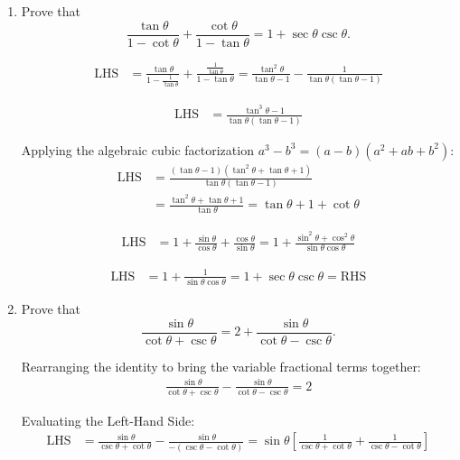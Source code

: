 \begin{enumerate}[label=\thesubsection.\arabic*, ref=\thesubsection.\theenumi]
	
	\item Prove that
	\[
	\frac{\tan\theta}{1-\cot\theta}
	+
	\frac{\cot\theta}{1-\tan\theta}
	=
	1 + \sec \theta \csc \theta.
	\]
	
	\solution
	
	\begin{align*}
		\text{LHS} &= \frac{\tan\theta}{1 - \frac{1}{\tan\theta}} + \frac{\frac{1}{\tan\theta}}{1 - \tan\theta} = \frac{\tan^2\theta}{\tan\theta - 1} - \frac{1}{\tan\theta(\tan\theta - 1)}
	\end{align*}

	\begin{align*}
		\text{LHS} &= \frac{\tan^3\theta - 1}{\tan\theta(\tan\theta - 1)}
	\end{align*}
	
	Applying the algebraic cubic factorization $a^3 - b^3 = (a - b)(a^2 + ab + b^2)$:
	\begin{align*}
		\text{LHS} &= \frac{(\tan\theta - 1)(\tan^2\theta + \tan\theta + 1)}{\tan\theta(\tan\theta - 1)} \\
		&= \frac{\tan^2\theta + \tan\theta + 1}{\tan\theta} 
		= \tan\theta + 1 + \cot\theta
	\end{align*}
	
	\begin{align*}
		\text{LHS} &= 1 + \frac{\sin\theta}{\cos\theta} + \frac{\cos\theta}{\sin\theta} 
		= 1 + \frac{\sin^2\theta + \cos^2\theta}{\sin\theta\cos\theta}
	\end{align*}
	
	\begin{align*}
		\text{LHS} &= 1 + \frac{1}{\sin\theta\cos\theta} 
		= 1 + \sec\theta\csc\theta = \text{RHS}
	\end{align*}
	

	\item Prove that
	\[
	\frac{\sin \theta}{\cot \theta+ \csc \theta}
	=
	2+\frac{\sin \theta}{\cot \theta- \csc \theta}.
	\]
	
	\solution
	Rearranging the identity to bring the variable fractional terms together:
	\begin{align*}
		\frac{\sin \theta}{\cot \theta + \csc \theta} - \frac{\sin \theta}{\cot \theta - \csc \theta} = 2
	\end{align*}
	
	Evaluating the Left-Hand Side:
	\begin{align*}
		\text{LHS} &= \frac{\sin\theta}{\csc\theta + \cot\theta} - \frac{\sin\theta}{-(\csc\theta - \cot\theta)} 
		= \sin\theta \left[ \frac{1}{\csc\theta + \cot\theta} + \frac{1}{\csc\theta - \cot\theta} \right]
	\end{align*}
	

\end{enumerate}
